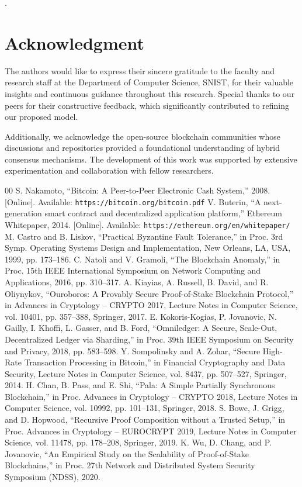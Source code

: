 \documentclass[conference]{IEEEtran}
\begin{document}
.

\section*{Acknowledgment}

The authors would like to express their sincere gratitude to the faculty and research staff at the Department of Computer Science, SNIST, for their valuable insights and continuous guidance throughout this research. Special thanks to our peers for their constructive feedback, which significantly contributed to refining our proposed model.

Additionally, we acknowledge the open-source blockchain communities whose discussions and repositories provided a foundational understanding of hybrid consensus mechanisms. The development of this work was supported by extensive experimentation and collaboration with fellow researchers.



\begin{thebibliography}{00}
 S. Nakamoto, ``Bitcoin: A Peer-to-Peer Electronic Cash System,'' 2008. [Online]. Available: \texttt{https://bitcoin.org/bitcoin.pdf}
 V. Buterin, ``A next-generation smart contract and decentralized application platform,'' Ethereum Whitepaper, 2014. [Online]. Available: \texttt{https://ethereum.org/en/whitepaper/}
 M. Castro and B. Liskov, ``Practical Byzantine Fault Tolerance,'' in Proc. 3rd Symp. Operating Systems Design and Implementation, New Orleans, LA, USA, 1999, pp. 173--186.
 C. Natoli and V. Gramoli, ``The Blockchain Anomaly,'' in Proc. 15th IEEE International Symposium on Network Computing and Applications, 2016, pp. 310--317.
 A. Kiayias, A. Russell, B. David, and R. Oliynykov, ``Ouroboros: A Provably Secure Proof-of-Stake Blockchain Protocol,'' in Advances in Cryptology – CRYPTO 2017, Lecture Notes in Computer Science, vol. 10401, pp. 357–388, Springer, 2017.
 E. Kokoris-Kogias, P. Jovanovic, N. Gailly, I. Khoffi, L. Gasser, and B. Ford, ``Omniledger: A Secure, Scale-Out, Decentralized Ledger via Sharding,'' in Proc. 39th IEEE Symposium on Security and Privacy, 2018, pp. 583--598.
 Y. Sompolinsky and A. Zohar, ``Secure High-Rate Transaction Processing in Bitcoin,'' in Financial Cryptography and Data Security, Lecture Notes in Computer Science, vol. 8437, pp. 507--527, Springer, 2014.
 H. Chan, B. Pass, and E. Shi, ``Pala: A Simple Partially Synchronous Blockchain,'' in Proc. Advances in Cryptology – CRYPTO 2018, Lecture Notes in Computer Science, vol. 10992, pp. 101--131, Springer, 2018.
 S. Bowe, J. Grigg, and D. Hopwood, ``Recursive Proof Composition without a Trusted Setup,'' in Proc. Advances in Cryptology – EUROCRYPT 2019, Lecture Notes in Computer Science, vol. 11478, pp. 178--208, Springer, 2019.
 K. Wu, D. Chang, and P. Jovanovic, ``An Empirical Study on the Scalability of Proof-of-Stake Blockchains,'' in Proc. 27th Network and Distributed System Security Symposium (NDSS), 2020.
\end{thebibliography}
\end{document}
